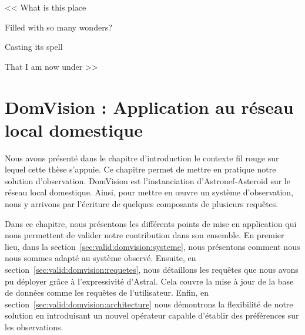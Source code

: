 \begin{savequote}[6cm]
<< What is this place

Filled with so many wonders?

Casting its spell

That I am now under >>

\end{savequote}

\chapter{DomVision : Application au réseau local domestique}\label{chap:valid:domvision}
\chaptertoc
Nous avons présenté dans le chapitre d'introduction le contexte fil rouge sur lequel cette thèse s'appuie. Ce chapitre permet de mettre en pratique notre solution d'observation. DomVision est l'instanciation d'Astronef-Asteroid sur le réseau local domestique. Ainsi, pour mettre en œuvre un système d'observation, nous y arrivons par l'écriture de quelques composants de plusieurs requêtes.

Dans ce chapitre, nous présentons les différents points de mise en application qui nous permettent de valider notre contribution dans son ensemble. En premier lieu, dans la section~\ref{sec:valid:domvision:systeme}, nous présentons comment nous nous sommes adapté au système observé. Ensuite, en section~\ref{sec:valid:domvision:requetes}, nous détaillons les requêtes que nous avons pu déployer grâce à l'expressivité d'Astral. Cela couvre la mise à jour de la base de données comme les requêtes de l'utilisateur. Enfin, en section~\ref{sec:valid:domvision:architecture} nous démontrons la flexibilité de notre solution en introduisant un nouvel opérateur capable d'établir des préférences sur les observations.





